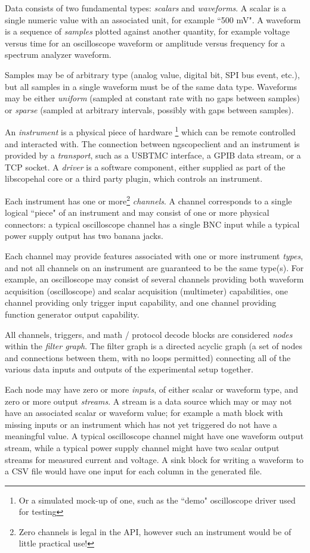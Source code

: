 Data consists of two fundamental types: \emph{scalars} and \emph{waveforms}. A scalar is a single numeric value with an
associated unit, for example ``500 mV". A waveform is a sequence of \emph{samples} plotted against another quantity, for
example voltage versus time for an oscilloscope waveform or amplitude versus frequency for a spectrum analyzer
waveform.

Samples may be of arbitrary type (analog value, digital bit, SPI bus event, etc.), but all samples in a
single waveform must be of the same data type. Waveforms may be either \emph{uniform} (sampled at constant rate with no
gaps between samples) or \emph{sparse} (sampled at arbitrary intervals, possibly with gaps between samples).

An \emph{instrument} is a physical piece of hardware \footnote{Or a simulated mock-up of one, such as the ``demo"
oscilloscope driver used for testing} which can be remote controlled and interacted with. The connection between
ngscopeclient and an instrument is provided by a \emph{transport}, such as a USBTMC interface, a GPIB data stream, or a
TCP socket. A \emph{driver} is a software component, either supplied as part of the libscopehal core or a third party
plugin, which controls an instrument.

Each instrument has one or more\footnote{Zero channels is legal in the API, however such an instrument would be of
little practical use!} \emph{channels}. A channel corresponds to a single logical ``piece" of an instrument and may
consist of one or more physical connectors: a typical oscilloscope channel has a single BNC input while a typical power
supply output has two banana jacks.

Each channel may provide features associated with one or more instrument \emph{types}, and not all channels on an
instrument are guaranteed to be the same type(s). For example, an oscilloscope may consist of several channels
providing both waveform acquisition (oscilloscope) and scalar acquisition (multimeter) capabilities, one channel
providing only trigger input capability, and one channel providing function generator output capability.

All channels, triggers, and math / protocol decode blocks are considered \emph{nodes} within the \emph{filter graph}.
The filter graph is a directed acyclic graph (a set of nodes and connections between them, with no loops permitted)
connecting all of the various data inputs and outputs of the experimental setup together.

Each node may have zero or more \emph{inputs}, of either scalar or waveform type, and zero or more output
\emph{streams}. A stream is a data source which may or may not have an associated scalar or waveform value; for example
a math block with missing inputs or an instrument which has not yet triggered do not have a meaningful value. A typical
oscilloscope channel might have one waveform output stream, while a typical power supply channel might have two scalar
output streams for measured current and voltage. A sink block for writing a waveform to a CSV file would have one input
for each column in the generated file.

